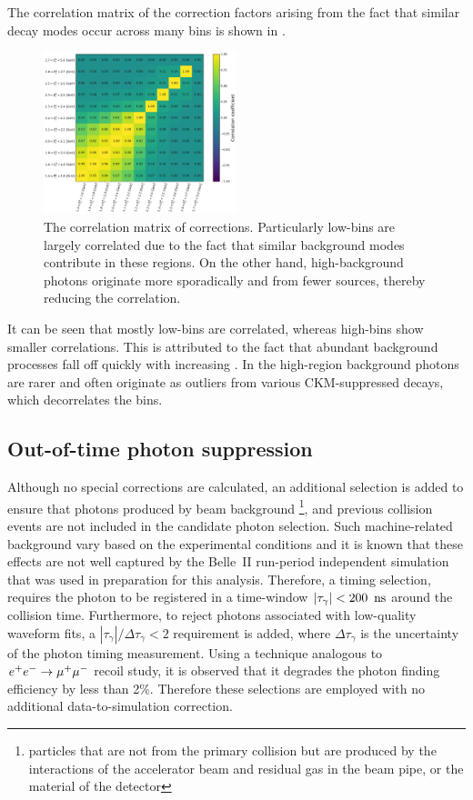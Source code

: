 The correlation matrix of the correction factors arising from the fact that similar decay modes occur across many bins is shown in .
\begin{figure}[htbp!]
    \centering
    \includegraphics[width=0.5\textwidth]{figures/data_sim_corrections/bbar_correlation_matrix.pdf}
    \caption{\label{fig:bbar_correlation_matrix} The correlation matrix of \BB corrections.
    Particularly low-\EB bins are largely correlated due to the fact that similar background modes contribute in these regions.
    On the other hand, high-\EB background photons originate more sporadically and from fewer sources, thereby reducing the correlation.
    }
\end{figure}
It can be seen that mostly low-\EB bins are correlated, whereas high-\EB bins show smaller correlations.
This is attributed to the fact that abundant background processes fall off quickly with increasing \EB.
In the high-\EB region background photons are rarer and often originate as outliers from various CKM-suppressed decays, which decorrelates the bins.

\subsection{Out-of-time photon suppression}\label{sec:out_of_time_photon_suppression}

Although no special corrections are calculated, an additional selection is added to ensure that photons produced by beam background
\footnote{particles that are not from the primary collision but are produced by the interactions of the accelerator beam 
and residual gas in the beam pipe, or the material of the detector},
and previous collision events are not included in the candidate photon selection.
Such machine-related background vary based on the experimental conditions and it is known that these effects are not well captured by the Belle~II run-period independent simulation that was used in preparation for this analysis.
Therefore, a timing selection, requires the photon to be registered in a time-window $|\tau_{\gamma}|<200~{\rm \,ns}$ around the collision time.
Furthermore, to reject photons associated with low-quality waveform fits, a $|\tau_{\gamma}|/\Delta\tau_{\gamma}<2$ requirement is added, 
where $\Delta\tau_{\gamma}$ is the uncertainty of the photon timing measurement.
Using a technique analogous to $e^+e^-\rightarrow\mu^+\mu^-$ recoil study, it is observed that it degrades the photon finding efficiency by less than 2\%.
Therefore these selections are employed with no additional data-to-simulation correction.